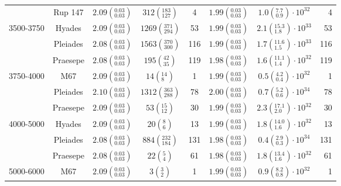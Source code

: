 \begin{tabular}{lccccccr}
          & Rup 147 &  $2.09\left(^{0.03}_{0.03}\right)$ &     $312\left(^{183}_{127}\right)$ &              4 &  $1.99\left(^{0.03}_{0.03}\right)$ &   $1.0\left(^{7.7}_{0.9}\right)\cdot 10^{32}$ &                4 \\
3500-3750 & Hyades &  $2.09\left(^{0.03}_{0.03}\right)$ &    $1269\left(^{371}_{294}\right)$ &             53 &  $1.99\left(^{0.03}_{0.03}\right)$ &  $2.1\left(^{15.3}_{1.8}\right)\cdot 10^{33}$ &               53 \\
          & Pleiades &  $2.08\left(^{0.03}_{0.03}\right)$ &    $1563\left(^{370}_{300}\right)$ &            116 &  $1.99\left(^{0.03}_{0.03}\right)$ &  $1.7\left(^{11.6}_{1.5}\right)\cdot 10^{33}$ &              116 \\
          & Praesepe &  $2.08\left(^{0.03}_{0.03}\right)$ &       $195\left(^{42}_{35}\right)$ &            119 &  $1.98\left(^{0.03}_{0.03}\right)$ &  $1.6\left(^{11.1}_{1.4}\right)\cdot 10^{32}$ &              119 \\
3750-4000 & M67 &  $2.09\left(^{0.03}_{0.03}\right)$ &         $14\left(^{14}_{8}\right)$ &              1 &  $1.99\left(^{0.03}_{0.03}\right)$ &   $0.5\left(^{4.2}_{0.4}\right)\cdot 10^{32}$ &                1 \\
          & Pleiades &  $2.10\left(^{0.03}_{0.03}\right)$ &    $1312\left(^{363}_{288}\right)$ &             78 &  $2.00\left(^{0.03}_{0.03}\right)$ &   $0.7\left(^{5.2}_{0.6}\right)\cdot 10^{34}$ &               78 \\
          & Praesepe &  $2.09\left(^{0.03}_{0.03}\right)$ &        $53\left(^{15}_{12}\right)$ &             30 &  $1.99\left(^{0.03}_{0.03}\right)$ &  $2.3\left(^{17.1}_{2.0}\right)\cdot 10^{32}$ &               30 \\
4000-5000 & Hyades &  $2.09\left(^{0.03}_{0.03}\right)$ &          $20\left(^{8}_{6}\right)$ &             13 &  $1.99\left(^{0.03}_{0.03}\right)$ &  $1.8\left(^{14.0}_{1.6}\right)\cdot 10^{32}$ &               13 \\
          & Pleiades &  $2.08\left(^{0.03}_{0.03}\right)$ &     $884\left(^{232}_{184}\right)$ &            131 &  $1.98\left(^{0.03}_{0.03}\right)$ &   $0.4\left(^{2.9}_{0.3}\right)\cdot 10^{34}$ &              131 \\
          & Praesepe &  $2.08\left(^{0.03}_{0.03}\right)$ &          $22\left(^{5}_{4}\right)$ &             61 &  $1.98\left(^{0.03}_{0.03}\right)$ &  $1.8\left(^{13.4}_{1.6}\right)\cdot 10^{32}$ &               61 \\
5000-6000 & M67 &  $2.09\left(^{0.03}_{0.03}\right)$ &           $3\left(^{3}_{2}\right)$ &              1 &  $1.99\left(^{0.03}_{0.03}\right)$ &   $0.9\left(^{8.2}_{0.8}\right)\cdot 10^{32}$ &                1 \\

\end{tabular}

